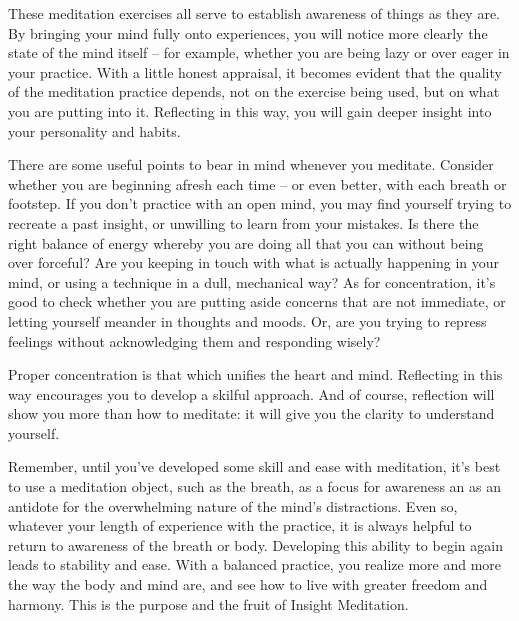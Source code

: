 
These meditation exercises all serve to establish awareness of things as
they are. By bringing your mind fully onto experiences, you will notice
more clearly the state of the mind itself -- for example, whether you are
being lazy or over eager in your practice. With a little honest
appraisal, it becomes evident that the quality of the meditation
practice depends, not on the exercise being used, but on what you are
putting into it. Reflecting in this way, you will gain deeper insight
into your personality and habits.

There are some useful points to bear in mind whenever you meditate.
Consider whether you are beginning afresh each time -- or even better,
with each breath or footstep. If you don't practice with an open mind,
you may find yourself trying to recreate a past insight, or unwilling to
learn from your mistakes. Is there the right balance of energy whereby
you are doing all that you can without being over forceful? Are you
keeping in touch with what is actually happening in your mind, or using
a technique in a dull, mechanical way? As for concentration, it's good
to check whether you are putting aside concerns that are not immediate,
or letting yourself meander in thoughts and moods. Or, are you trying to
repress feelings without acknowledging them and responding wisely?

Proper concentration is that which unifies the heart and mind.
Reflecting in this way encourages you to develop a skilful approach. And
of course, reflection will show you more than how to meditate: it will
give you the clarity to understand yourself.

Remember, until you've developed some skill and ease with meditation,
it's best to use a meditation object, such as the breath, as a focus for
awareness an as an antidote for the overwhelming nature of the mind's
distractions. Even so, whatever your length of experience with the
practice, it is always helpful to return to awareness of the breath or
body. Developing this ability to begin again leads to stability and
ease. With a balanced practice, you realize more and more the way the
body and mind are, and see how to live with greater freedom and harmony.
This is the purpose and the fruit of Insight Meditation.

